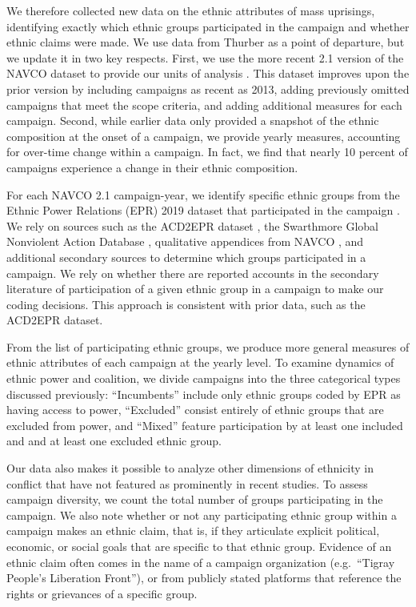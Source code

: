 \documentclass[
  letterpaper,
  DIV=11,
  numbers=noendperiod]{scrartcl}
\begin{document}
We therefore collected new data on the ethnic attributes of mass
uprisings, identifying exactly which ethnic groups participated in the
campaign and whether ethnic claims were made. We use data from Thurber
\autocite*{Thurber2018} as a point of departure, but we update it in two
key respects. First, we use the more recent 2.1 version of the NAVCO
dataset to provide our units of analysis \autocite{Chenoweth2022}. This
dataset improves upon the prior version by including campaigns as recent
as 2013, adding previously omitted campaigns that meet the scope
criteria, and adding additional measures for each campaign. Second,
while earlier data only provided a snapshot of the ethnic composition at
the onset of a campaign, we provide yearly measures, accounting for
over-time change within a campaign. In fact, we find that nearly 10
percent of campaigns experience a change in their ethnic composition.

For each NAVCO 2.1 campaign-year, we identify specific ethnic groups
from the Ethnic Power Relations (EPR) 2019 dataset that participated in
the campaign \autocite{Vogt2015}. We rely on sources such as the ACD2EPR
dataset \autocite{Wucherpfennig2012}, the Swarthmore Global Nonviolent
Action Database \autocite{Lakey2011}, qualitative appendices from NAVCO
\autocite{Chenoweth2011}, and additional secondary sources to determine
which groups participated in a campaign. We rely on whether there are
reported accounts in the secondary literature of participation of a
given ethnic group in a campaign to make our coding decisions. This
approach is consistent with prior data, such as the ACD2EPR dataset.

From the list of participating ethnic groups, we produce more general
measures of ethnic attributes of each campaign at the yearly level. To
examine dynamics of ethnic power and coalition, we divide campaigns into
the three categorical types discussed previously: ``Incumbents'' include
only ethnic groups coded by EPR as having access to power, ``Excluded''
consist entirely of ethnic groups that are excluded from power, and
``Mixed'' feature participation by at least one included and and at
least one excluded ethnic group.

Our data also makes it possible to analyze other dimensions of ethnicity
in conflict that have not featured as prominently in recent studies. To
assess campaign diversity, we count the total number of groups
participating in the campaign. We also note whether or not any
participating ethnic group within a campaign makes an ethnic claim, that
is, if they articulate explicit political, economic, or social goals
that are specific to that ethnic group. Evidence of an ethnic claim
often comes in the name of a campaign organization (e.g.~``Tigray
People's Liberation Front''), or from publicly stated platforms that
reference the rights or grievances of a specific group.
\end{document}
